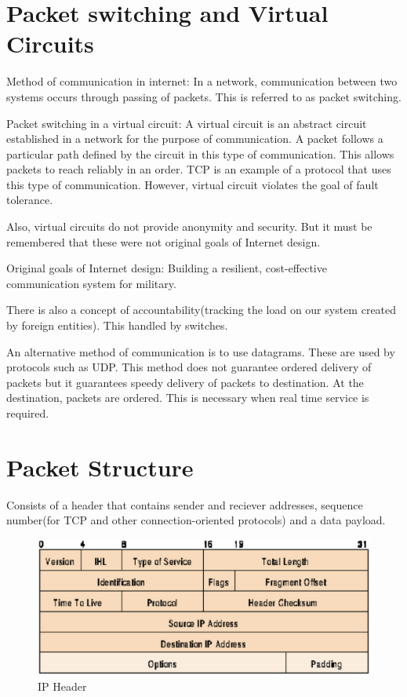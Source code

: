 ﻿\documentclass[twoside]{article}
\begin{document}
\section{Packet switching and Virtual Circuits}

Method of communication in internet: In a network, communication between two systems occurs through passing of packets. This
is referred to as packet switching. 

Packet switching in a virtual circuit: A virtual circuit is an abstract circuit established in a network for the purpose of 
communication. A packet follows a particular path defined by the circuit in this type of communication. This allows packets to
reach reliably in an order. TCP is an example of a protocol that uses this type of communication. However, virtual circuit 
violates the goal of fault tolerance.

Also, virtual circuits do not provide anonymity and security. But it must be remembered that these were not original goals of 
Internet design.

Original goals of Internet design: Building a resilient, cost-effective communication system for military.

There is also a concept of accountability(tracking the load on our system created by foreign entities). This handled by switches.

An alternative method of communication is to use datagrams. These are used by protocols such as UDP. This method does not guarantee
ordered delivery of packets but it guarantees speedy delivery of packets to destination. At the destination, packets are ordered.
This is necessary when real time service is required.

\section{Packet Structure}
Consists of a header that contains sender and reciever addresses, sequence number(for TCP and other connection-oriented protocols)
and a data payload.

\begin{figure}[tph!]
\centerline{\includegraphics[totalheight=6cm]{iphdr-gif.eps}}
    \caption{IP Header}
    \label{fig:verticalcell}
\end{figure}
\end{document}
